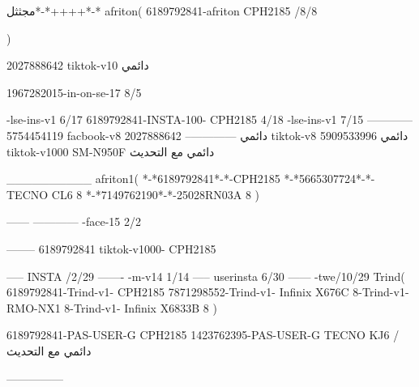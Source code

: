 مجثثل*-*++++*-*
afriton(
6189792841-afriton CPH2185  /8/8

)

2027888642 tiktok-v10
دائمي

1967282015-in-on-se-17 8/5

-lse-ins-v1 6/17
6189792841-INSTA-100- CPH2185 4/18
-lse-ins-v1 7/15
------------
5754454119 facbook-v8
دائمي
--------------
2027888642 tiktok-v8
دائمي
5909533996 tiktok-v1000  SM-N950F
دائمي مع التحديث

__________
afriton1(
*-*6189792841*-*-CPH2185
*-*5665307724*-*-TECNO CL6  8\1
*-*7149762190*-*-25028RN03A  8
)


------
------------
-face-15 2/2

--------
6189792841 tiktok-v1000- CPH2185 


-----
 INSTA /2/29
-------
-m-v14 1/14
-----
userinsta 6/30
------
-twe/10/29
Trind(
6189792841-Trind-v1- CPH2185 
7871298552-Trind-v1-  Infinix X676C  8-Trind-v1-  RMO-NX1  8-Trind-v1-  Infinix X6833B  8\5
)


6189792841-PAS-USER-G CPH2185 
1423762395-PAS-USER-G TECNO KJ6  /دائمي مع التحديث

    ---------------
